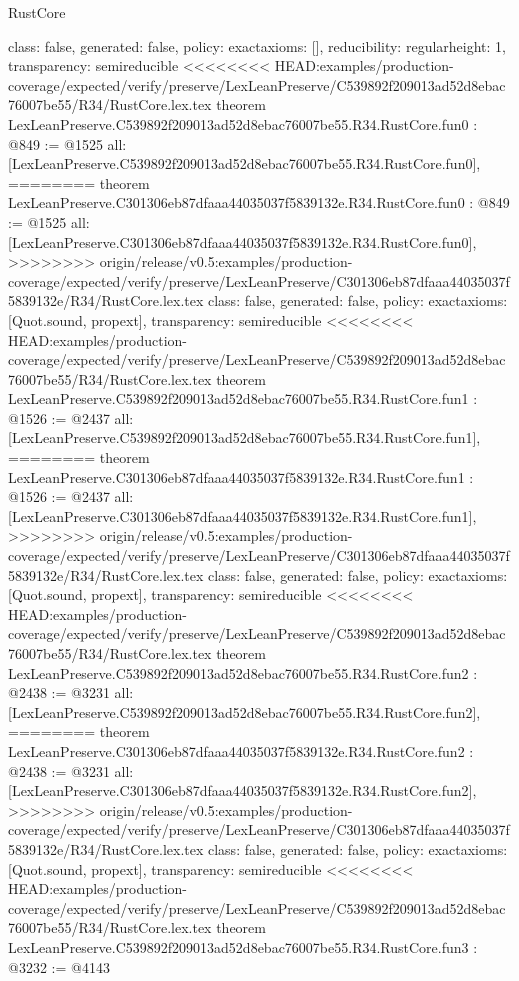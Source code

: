 \begin{lexlean}{RustCore}
\begin{coremodule}
{\begin{coremodule}
{{{  class: false,
  generated: false,
  policy: exact{axioms: []},
  reducibility: regular{height: 1},
  transparency: semireducible
}
<<<<<<<< HEAD:examples/production-coverage/expected/verify/preserve/LexLeanPreserve/C539892f209013ad52d8ebac76007be55/R34/RustCore.lex.tex
theorem LexLeanPreserve.C539892f209013ad52d8ebac76007be55.R34.RustCore.fun0 : @849 := @1525 {
  all: [LexLeanPreserve.C539892f209013ad52d8ebac76007be55.R34.RustCore.fun0],
========
theorem LexLeanPreserve.C301306eb87dfaaa44035037f5839132e.R34.RustCore.fun0 : @849 := @1525 {
  all: [LexLeanPreserve.C301306eb87dfaaa44035037f5839132e.R34.RustCore.fun0],
>>>>>>>> origin/release/v0.5:examples/production-coverage/expected/verify/preserve/LexLeanPreserve/C301306eb87dfaaa44035037f5839132e/R34/RustCore.lex.tex
  class: false,
  generated: false,
  policy: exact{axioms: [Quot.sound, propext]},
  transparency: semireducible
}
<<<<<<<< HEAD:examples/production-coverage/expected/verify/preserve/LexLeanPreserve/C539892f209013ad52d8ebac76007be55/R34/RustCore.lex.tex
theorem LexLeanPreserve.C539892f209013ad52d8ebac76007be55.R34.RustCore.fun1 : @1526 := @2437 {
  all: [LexLeanPreserve.C539892f209013ad52d8ebac76007be55.R34.RustCore.fun1],
========
theorem LexLeanPreserve.C301306eb87dfaaa44035037f5839132e.R34.RustCore.fun1 : @1526 := @2437 {
  all: [LexLeanPreserve.C301306eb87dfaaa44035037f5839132e.R34.RustCore.fun1],
>>>>>>>> origin/release/v0.5:examples/production-coverage/expected/verify/preserve/LexLeanPreserve/C301306eb87dfaaa44035037f5839132e/R34/RustCore.lex.tex
  class: false,
  generated: false,
  policy: exact{axioms: [Quot.sound, propext]},
  transparency: semireducible
}
<<<<<<<< HEAD:examples/production-coverage/expected/verify/preserve/LexLeanPreserve/C539892f209013ad52d8ebac76007be55/R34/RustCore.lex.tex
theorem LexLeanPreserve.C539892f209013ad52d8ebac76007be55.R34.RustCore.fun2 : @2438 := @3231 {
  all: [LexLeanPreserve.C539892f209013ad52d8ebac76007be55.R34.RustCore.fun2],
========
theorem LexLeanPreserve.C301306eb87dfaaa44035037f5839132e.R34.RustCore.fun2 : @2438 := @3231 {
  all: [LexLeanPreserve.C301306eb87dfaaa44035037f5839132e.R34.RustCore.fun2],
>>>>>>>> origin/release/v0.5:examples/production-coverage/expected/verify/preserve/LexLeanPreserve/C301306eb87dfaaa44035037f5839132e/R34/RustCore.lex.tex
  class: false,
  generated: false,
  policy: exact{axioms: [Quot.sound, propext]},
  transparency: semireducible
}
<<<<<<<< HEAD:examples/production-coverage/expected/verify/preserve/LexLeanPreserve/C539892f209013ad52d8ebac76007be55/R34/RustCore.lex.tex
theorem LexLeanPreserve.C539892f209013ad52d8ebac76007be55.R34.RustCore.fun3 : @3232 := @4143 {
}}}}}}
\end{coremodule}}
\end{coremodule}
\end{lexlean}
